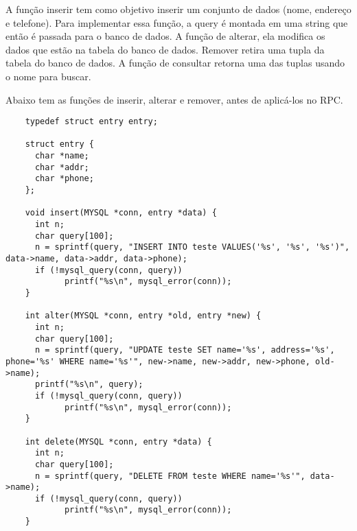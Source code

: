 \documentclass[12pt,a4paper]{article}
\begin{document}
A função inserir tem como objetivo inserir um conjunto de dados (nome, endereço e telefone).
Para implementar essa função, a query é montada em uma string que então é passada para o banco
de dados. A função de alterar, ela modifica os dados que estão na tabela do banco de dados.
Remover retira uma tupla da tabela do banco de dados. A função de consultar retorna uma das 
tuplas usando o nome para buscar.

Abaixo tem as funções de inserir, alterar e remover, antes de aplicá-los no RPC.

\lstset{language=C}
\begin{lstlisting}
	typedef struct entry entry;

	struct entry {
	  char *name;
	  char *addr; 
	  char *phone;
	};
	
	void insert(MYSQL *conn, entry *data) {
	  int n;
	  char query[100];
	  n = sprintf(query, "INSERT INTO teste VALUES('%s', '%s', '%s')", data->name, data->addr, data->phone);
	  if (!mysql_query(conn, query)) 
			printf("%s\n", mysql_error(conn));
	}

	int alter(MYSQL *conn, entry *old, entry *new) {
	  int n;
	  char query[100];
	  n = sprintf(query, "UPDATE teste SET name='%s', address='%s', phone='%s' WHERE name='%s'", new->name, new->addr, new->phone, old->name);
	  printf("%s\n", query);
	  if (!mysql_query(conn, query)) 
			printf("%s\n", mysql_error(conn));
	} 

	int delete(MYSQL *conn, entry *data) {
	  int n;
	  char query[100];
	  n = sprintf(query, "DELETE FROM teste WHERE name='%s'", data->name);
	  if (!mysql_query(conn, query)) 
			printf("%s\n", mysql_error(conn));
	}
\end{lstlisting}



\end{document}
